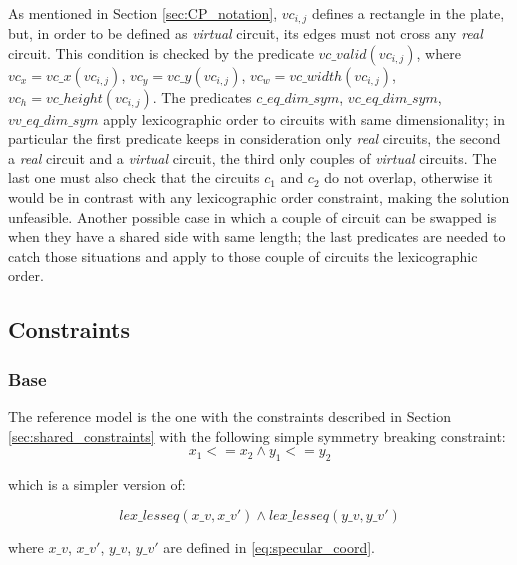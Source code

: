 \hfill \\
As mentioned in Section \ref{sec:CP_notation}, $vc_{i,j}$ defines a rectangle in the plate, but, in order to
be defined as \textit{virtual} circuit, its edges must not cross any \textit{real} circuit.
This condition is checked by the predicate $vc\_valid(vc_{i,j})$, where
$vc_x = vc\_x(vc_{i,j})$, $vc_y = vc\_y(vc_{i,j})$, $vc_w = vc\_width(vc_{i,j})$, $vc_h = vc\_height(vc_{i,j})$.
The predicates $c\_eq\_dim\_sym$, $vc\_eq\_dim\_sym$, $vv\_eq\_dim\_sym$ apply
lexicographic order to circuits with same dimensionality; in particular the first predicate keeps in consideration only
\textit{real} circuits, the second a \textit{real} circuit and a \textit{virtual} circuit, the third only couples of
\textit{virtual} circuits. The last one must also check that the circuits $c_1$ and $c_2$ do not overlap,
otherwise it would be in contrast with any lexicographic order constraint, making the solution unfeasible.
Another possible case in which a couple of circuit can be swapped is when they have a shared side with same length;
the last predicates are needed to catch those situations and apply to those couple of circuits the lexicographic order.


\subsection{Constraints}
\subsubsection{Base} \label{sec:CP_base}
The reference model is the one with the constraints described in Section \ref{sec:shared_constraints}
with the following simple symmetry breaking constraint:
\begin{equation*}
  x_1 <= x_2 \land y_1 <= y_2
\end{equation*}

which is a simpler version of:

\begin{equation*}
  lex\_lesseq(x\_v, x\_v') \land lex\_lesseq(y\_v, y\_v')
\end{equation*}

where $x\_v$, $x\_v'$, $y\_v$, $y\_v'$ are defined in \ref{eq:specular_coord}.


